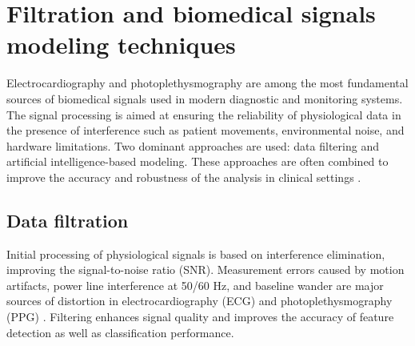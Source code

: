\documentclass[journal]{IEEEtran}
\begin{document}
\newpage
\section{Filtration and biomedical signals modeling techniques}
Electrocardiography and photoplethysmography are among the most fundamental sources of biomedical signals used in modern diagnostic and monitoring systems. The signal processing is aimed at ensuring the reliability of physiological data in the presence of interference such as patient movements, environmental noise, and hardware limitations. Two dominant approaches are used: data filtering and artificial intelligence-based modeling. These approaches are often combined to improve the accuracy and robustness of the analysis in clinical settings \cite{1}.

\subsection{Data filtration}
Initial processing of physiological signals is based on interference elimination, improving the signal-to-noise ratio (SNR). Measurement errors caused by motion artifacts, power line interference at 50/60 Hz, and baseline wander are major sources of distortion in electrocardiography (ECG) and photoplethysmography (PPG) \cite{2}. Filtering enhances signal quality and improves the accuracy of feature detection as well as classification performance.
\end{document}

